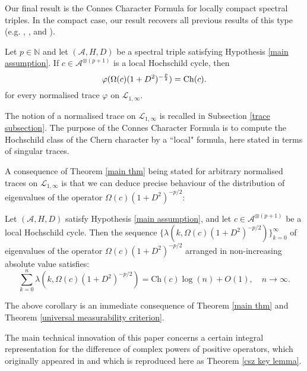     Our final result is the Connes Character Formula for locally compact spectral triples. In the compact case, our result recovers all previous results of this type 
    (e.g. \cite[Theorem 10.32]{GVF}, \cite[Theorem 6]{BF}, \cite[Theorem 10]{CPRS1} and \cite[Theorem 16]{CRSZ}).
    \begin{thm}\label{main thm} 
        Let $p\in\mathbb{N}$ and let $(\mathcal{A},H,D)$ be a spectral triple satisfying Hypothesis \ref{main assumption}. If $c\in\mathcal{A}^{\otimes (p+1)}$ is a local Hochschild cycle, then
        \begin{equation}\label{super main eq}
            \varphi(\Omega(c)(1+D^2)^{-\frac{p}{2}})={\rm Ch}(c).
        \end{equation}
        for every normalised trace $\varphi$ on $\mathcal{L}_{1,\infty}$.
    \end{thm}
    The notion of a normalised trace on $\mathcal{L}_{1,\infty}$ is recalled in Subsection \ref{trace subsection}. 
    { The purpose of the Connes Character Formula is to compute the Hochschild class of the Chern character by a ``local" formula,
    here stated in terms of singular traces.}
    
    { A consequence of Theorem \ref{main thm} being stated for arbitrary normalised traces on $\mathcal{L}_{1,\infty}$ is that we can deduce precise behaviour of the distribution
    of eigenvalues of the operator $\Omega(c)(1+D^2)^{-p/2}$:
    \begin{cor}
        Let $(\mathcal{A},H,D)$ satisfy Hypothesis \ref{main assumption}, and let $c \in \mathcal{A}^{\otimes (p+1)}$ be a local Hochschild cycle. Then the sequence
        $\{\lambda(k,\Omega(c)(1+D^2)^{-p/2})\}_{k=0}^\infty$ of eigenvalues of the operator $\Omega(c)(1+D^2)^{-p/2}$ arranged in non-increasing absolute value satisfies:
        \begin{equation*}
            \sum_{k=0}^n \lambda(k,\Omega(c)(1+D^2)^{-p/2}) = \mathrm{Ch}(c)\log(n)+O(1),\quad n\to\infty.
        \end{equation*}
    \end{cor}
    The above corollary is an immediate consequence of Theorem \ref{main thm} and Theorem \ref{universal measurability criterion}.
    }
        
    The main technical innovation of this paper concerns a certain integral representation for the difference of complex powers of positive operators, which originally
    appeared in \cite{CSZ} and which is reproduced here as Theorem \ref{csz key lemma}. 
    
